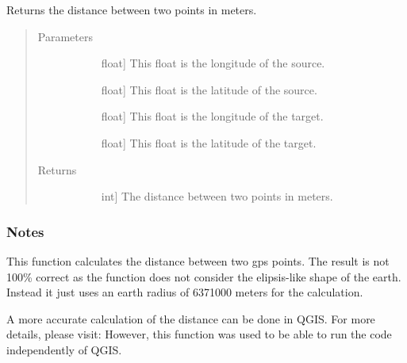 \documentclass[letterpaper,10pt,english]{sphinxmanual}
\begin{document}

\begin{fulllineitems}
\label{\detokenize{index:gps2net.distFrom}}
Returns the distance between two points in meters.
\begin{quote}\begin{description}
\item[{Parameters}] \leavevmode\begin{description}
\item[{}] \leavevmode{[}float{]}
This float is the longitude of the source.

\item[{}] \leavevmode{[}float{]}
This float is the latitude of the source.

\item[{}] \leavevmode{[}float{]}
This float is the longitude of the target.

\item[{}] \leavevmode{[}float{]}
This float is the latitude of the target.

\end{description}

\item[{Returns}] \leavevmode\begin{description}
\item[{}] \leavevmode{[}int{]}
The distance between two points in meters.

\end{description}

\end{description}\end{quote}
\subsubsection*{Notes}

This function calculates the distance between two gps points.
The result is not 100\% correct as the function does not consider the elipsis-like shape of the earth. Instead it just uses an earth radius of 6371000 meters for the calculation.

A more accurate calculation of the distance can be done in QGIS. For more details, please visit: 
However, this function was used to be able to run the code independently of QGIS.

\end{fulllineitems}
\end{document}
